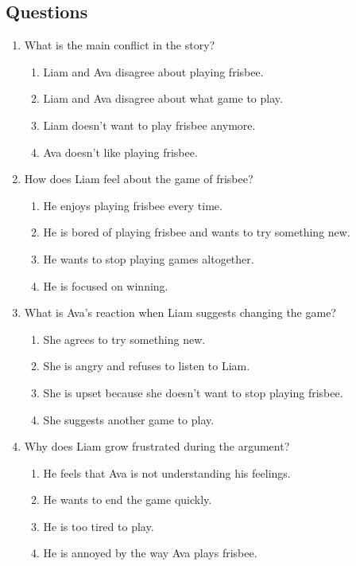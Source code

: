 \documentclass[12pt]{article}
\begin{document}
\subsection*{Questions}

\begin{enumerate}

    \item What is the main conflict in the story?
    \begin{enumerate}[label=\Alph*.]
        \item Liam and Ava disagree about playing frisbee.
        \item Liam and Ava disagree about what game to play.
        \item Liam doesn’t want to play frisbee anymore.
        \item Ava doesn’t like playing frisbee.
    \end{enumerate}
    \vspace{0.5cm}

    \item How does Liam feel about the game of frisbee?
    \begin{enumerate}[label=\Alph*.]
        \item He enjoys playing frisbee every time.
        \item He is bored of playing frisbee and wants to try something new.
        \item He wants to stop playing games altogether.
        \item He is focused on winning.
    \end{enumerate}
    \vspace{0.5cm}

    \item What is Ava’s reaction when Liam suggests changing the game?
    \begin{enumerate}[label=\Alph*.]
        \item She agrees to try something new.
        \item She is angry and refuses to listen to Liam.
        \item She is upset because she doesn’t want to stop playing frisbee.
        \item She suggests another game to play.
    \end{enumerate}
    \vspace{0.5cm}

    \item Why does Liam grow frustrated during the argument?
    \begin{enumerate}[label=\Alph*.]
        \item He feels that Ava is not understanding his feelings.
        \item He wants to end the game quickly.
        \item He is too tired to play.
        \item He is annoyed by the way Ava plays frisbee.
    \end{enumerate}
    \vspace{0.5cm}


\end{enumerate}
\end{document}
